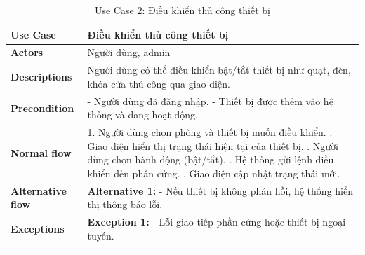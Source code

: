 \begin{longtable}{|p{}|p{}|}
    \hline
    \textbf{Use Case}         & Điều khiển thủ công thiết bị                                                                  \\
    \hline
    \textbf{Actors}           & Người dùng, admin                                                                             \\
    \hline
    \textbf{Descriptions}     & Người dùng có thể điều khiển bật/tắt thiết bị như quạt, đèn, khóa cửa thủ công qua giao diện. \\
    \hline
    \textbf{Precondition}     &
    - Người dùng đã đăng nhập. \newline
    - Thiết bị được thêm vào hệ thống và đang hoạt động.                                                                      \\
    \hline
    \textbf{Normal flow}      &
    1. Người dùng chọn phòng và thiết bị muốn điều khiển. \newline
    2. Giao diện hiển thị trạng thái hiện tại của thiết bị. \newline
    3. Người dùng chọn hành động (bật/tắt). \newline
    4. Hệ thống gửi lệnh điều khiển đến phần cứng. \newline
    5. Giao diện cập nhật trạng thái mới.                                                                                     \\
    \hline
    \textbf{Alternative flow} &
    \textbf{Alternative 1:} \newline
    - Nếu thiết bị không phản hồi, hệ thống hiển thị thông báo lỗi.                                                           \\
    \hline
    \textbf{Exceptions}       &
    \textbf{Exception 1:} \newline
    - Lỗi giao tiếp phần cứng hoặc thiết bị ngoại tuyến.                                                                      \\
    \hline
    \caption{Use Case 2: Điều khiển thủ công thiết bị}
    \label{tab:usecase2}
\end{longtable}



